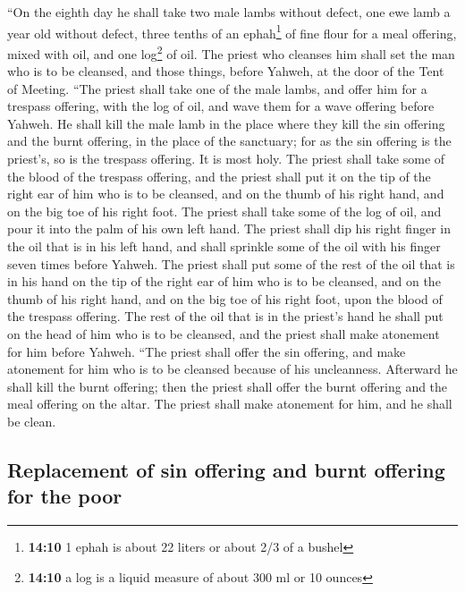  ``On the eighth day he shall take two male lambs without
defect, one ewe lamb a year old without defect, three tenths of an
ephah\footnote{\textbf{14:10} 1 ephah is about 22 liters or about 2/3 of
  a bushel} of fine flour for a meal offering, mixed with oil, and one
log\footnote{\textbf{14:10} a log is a liquid measure of about 300 ml or
  10 ounces} of oil.  The priest who cleanses him shall
set the man who is to be cleansed, and those things, before Yahweh, at
the door of the Tent of Meeting.  ``The priest shall take
one of the male lambs, and offer him for a trespass offering, with the
log of oil, and wave them for a wave offering before Yahweh.
 He shall kill the male lamb in the place where they kill
the sin offering and the burnt offering, in the place of the sanctuary;
for as the sin offering is the priest's, so is the trespass offering. It
is most holy.  The priest shall take some of the blood of
the trespass offering, and the priest shall put it on the tip of the
right ear of him who is to be cleansed, and on the thumb of his right
hand, and on the big toe of his right foot.  The priest
shall take some of the log of oil, and pour it into the palm of his own
left hand.  The priest shall dip his right finger in the
oil that is in his left hand, and shall sprinkle some of the oil with
his finger seven times before Yahweh.  The priest shall
put some of the rest of the oil that is in his hand on the tip of the
right ear of him who is to be cleansed, and on the thumb of his right
hand, and on the big toe of his right foot, upon the blood of the
trespass offering.  The rest of the oil that is in the
priest's hand he shall put on the head of him who is to be cleansed, and
the priest shall make atonement for him before Yahweh. 
``The priest shall offer the sin offering, and make atonement for him
who is to be cleansed because of his uncleanness. Afterward he shall
kill the burnt offering;  then the priest shall offer the
burnt offering and the meal offering on the altar. The priest shall make
atonement for him, and he shall be clean.

\hypertarget{replacement-of-sin-offering-and-burnt-offering-for-the-poor}{%
\subsection{Replacement of sin offering and burnt offering for the
poor}\label{replacement-of-sin-offering-and-burnt-offering-for-the-poor}}

